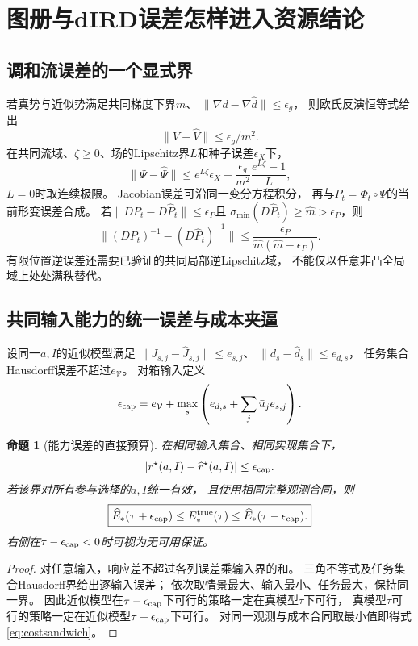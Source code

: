 \documentclass[11pt,a4paper]{article}
\numberwithin{equation}{section}
\newtheorem{proposition}[theorem]{命题}
\theoremstyle{definition}
\newcommand{\V}{\mathcal V}
\begin{document}
\section{图册与dIRD误差怎样进入资源结论}
\subsection{调和流误差的一个显式界}
若真势与近似势满足共同梯度下界$m$、
$\|\nabla d-\nabla\widehat d\|\le\epsilon_g$，
则欧氏反演恒等式给出
\[
 \|V-\widehat V\|\le\epsilon_g/m^2.
\]
在共同流域、$\zeta\ge0$、场的Lipschitz界$L$和种子误差$\epsilon_X$下，
\begin{equation}
 \|\Psi-\widehat\Psi\|
 \le e^{L\zeta}\epsilon_X+
 \frac{\epsilon_g}{m^2}\frac{e^{L\zeta}-1}{L},
 \label{eq:flowerror}
\end{equation}
$L=0$时取连续极限。
Jacobian误差可沿同一变分方程积分，
再与$P_t=\Phi_t\circ\Psi$的当前形变误差合成。
若$\|DP_t-D\widehat P_t\|\le\epsilon_P$且
$\sigma_{\min}(D\widehat P_t)\ge\widehat m>\epsilon_P$，则
\begin{equation}
 \|(DP_t)^{-1}-(D\widehat P_t)^{-1}\|
 \le\frac{\epsilon_P}{\widehat m(\widehat m-\epsilon_P)}.
 \label{eq:inverseerror}
\end{equation}
有限位置逆误差还需要已验证的共同局部逆Lipschitz域，
不能仅以任意非凸全局域上处处满秩替代。

\subsection{共同输入能力的统一误差与成本夹逼}
设同一$a,I$的近似模型满足
$\|J_{s,j}-\widehat J_{s,j}\|\le e_{s,j}$、
$\|d_s-\widehat d_s\|\le e_{d,s}$，
任务集合Hausdorff误差不超过$e_\V$。
对箱输入定义
\[
 \epsilon_{\rm cap}=
 e_\V+\max_s\left(e_{d,s}+\sum_j\bar u_j e_{s,j}\right).
\]
\begin{proposition}[能力误差的直接预算]
在相同输入集合、相同实现集合下，
\begin{equation}
 |r^\star(a,I)-\widehat r^\star(a,I)|\le\epsilon_{\rm cap}.
 \label{eq:caperror}
\end{equation}
若该界对所有参与选择的$a,I$统一有效，
且使用相同完整观测合同，则
\begin{equation}
 \boxed{
 \widehat E_*(\tau+\epsilon_{\rm cap})
 \le E_*^{\rm true}(\tau)
 \le \widehat E_*(\tau-\epsilon_{\rm cap}).}
 \label{eq:costsandwich}
\end{equation}
右侧在$\tau-\epsilon_{\rm cap}<0$时可视为无可用保证。
\end{proposition}
\begin{proof}
对任意输入，响应差不超过各列误差乘输入界的和。
三角不等式及任务集合Hausdorff界给出逐输入误差；
依次取情景最大、输入最小、任务最大，保持同一界。
因此近似模型在$\tau-\epsilon_{\rm cap}$下可行的策略一定在真模型$\tau$下可行，
真模型$\tau$可行的策略一定在近似模型$\tau+\epsilon_{\rm cap}$下可行。
对同一观测与成本合同取最小值即得式\eqref{eq:costsandwich}。
\end{proof}
\end{document}
